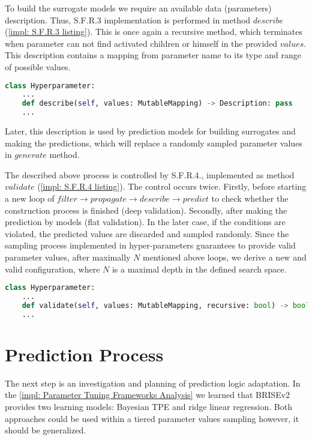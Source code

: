 To build the surrogate models we require an available data (parameters) description. Thus, S.F.R.3 implementation is performed in method $describe$ (\cref{impl: S.F.R.3 listing}). This is once again a recursive method, which terminates when parameter can not find activated children or himself in the provided $values$. 
This description contains a mapping from parameter name to its type and range of possible values.

\begin{lstlisting}[language=Python, caption=S.F.R.3 implementation., label=impl: S.F.R.3 listing]
class Hyperparameter:
	...
    def describe(self, values: MutableMapping) -> Description: pass
	...
\end{lstlisting}

Later, this description is used by prediction models for building surrogates and making the predictions, which will replace a randomly sampled parameter values in $generate$ method.

The described above process is controlled by S.F.R.4., implemented as method $validate$ (\cref{impl: S.F.R.4 listing}). The control occurs twice. Firstly, before starting a new loop of $filter \rightarrow propagate \rightarrow describe \rightarrow predict$ to check whether the construction process is finished (deep validation). Secondly, after making the prediction by models (flat validation). In the later case, if the conditions are violated, the predicted values are discarded and sampled randomly. Since the sampling process implemented in hyper-parameters guarantees to provide valid parameter values, after maximally $N$ mentioned above loops, we derive a new and valid configuration, where $N$ is a maximal depth in the defined search space.

\begin{lstlisting}[language=Python, caption=S.F.R.4 implementation., label=impl: S.F.R.4 listing]
class Hyperparameter:
	...
	def validate(self, values: MutableMapping, recursive: bool) -> bool: pass
	...
\end{lstlisting}


\section{Prediction Process}\label{impl: prediction logic}
The next step is an investigation and planning of prediction logic adaptation.
In the \cref{impl: Parameter Tuning Frameworks Analysis} we learned that BRISEv2 provides two learning models: Bayesian TPE and ridge linear regression. Both approaches could be used within a tiered parameter values sampling however, it should be generalized.


